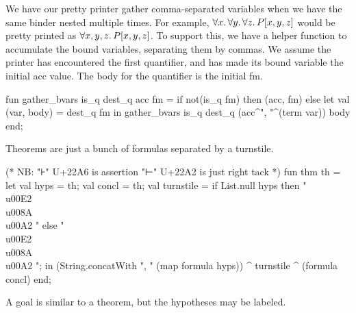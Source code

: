 \begin{node}
We have our pretty printer gather comma-separated variables when we
have the same binder nested multiple times. For example, $\forall
x\ldotp\forall y\ldotp\forall z\ldotp P[x,y,z]$ would be pretty
printed as $\forall x,y,z\ldotp P[x,y,z]$. To support this, we have a
helper function to accumulate the bound variables, separating them by
commas. We assume the printer has encountered the first quantifier,
and has made its bound variable the initial {\Tt{}acc\nwendquote} value. The body
for the quantifier is the initial {\Tt{}fm\nwendquote}.
\end{node}

\nwenddocs{}\endmoddef\nwstartdeflinemarkup{}\nwenddeflinemarkup
fun gather_bvars is_q dest_q acc fm =
  if not(is_q fm) then (acc, fm)
  else let val (var, body) = dest_q fm
       in gather_bvars is_q dest_q (acc^", "^(term var)) body
       end;
\nwendcode{}\nwdocspar

\begin{node}
Theorems are just a bunch of formulas separated by a turnstile.
\end{node}

\nwenddocs{}\endmoddef\nwstartdeflinemarkup{}\nwenddeflinemarkup
(* NB: "⊦" U+22A6 is assertion
 "⊢" U+22A2 is just right tack *)
fun thm th =
  let
    val hyps =  th;
    val concl =  th;
    val turnstile = if List.null hyps
                    then "\\u00E2\\u008A\\u00A2 "
                    else " \\u00E2\\u008A\\u00A2 ";
  in
    (String.concatWith ", " (map formula hyps)) ^
    turnstile ^
    (formula concl)
  end;
\eatline
{}\nwendcode{}\nwdocspar
\begin{node}
A goal is similar to a theorem, but the hypotheses may be labeled.
\end{node}

